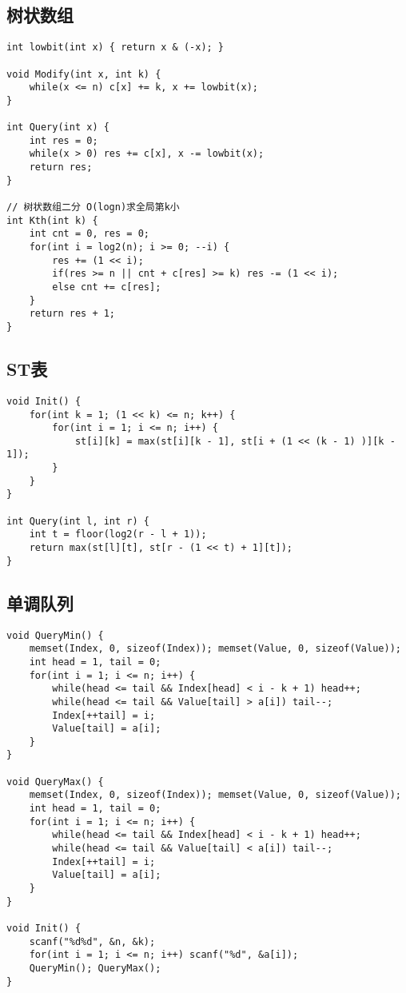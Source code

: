 \subsection{树状数组}
\begin{lstlisting}
int lowbit(int x) { return x & (-x); }

void Modify(int x, int k) {
	while(x <= n) c[x] += k, x += lowbit(x);
} 

int Query(int x) {
	int res = 0;
	while(x > 0) res += c[x], x -= lowbit(x);
	return res;
}

// 树状数组二分 O(logn)求全局第k小
int Kth(int k) {
	int cnt = 0, res = 0;
	for(int i = log2(n); i >= 0; --i) {
		res += (1 << i);
		if(res >= n || cnt + c[res] >= k) res -= (1 << i);
		else cnt += c[res];
	}
	return res + 1;
}
\end{lstlisting}


\subsection{ST表}
\begin{lstlisting}
void Init() {
	for(int k = 1; (1 << k) <= n; k++) {
		for(int i = 1; i <= n; i++) {
			st[i][k] = max(st[i][k - 1], st[i + (1 << (k - 1) )][k - 1]);
		}
	}
}

int Query(int l, int r) {
	int t = floor(log2(r - l + 1));
	return max(st[l][t], st[r - (1 << t) + 1][t]);
}
\end{lstlisting}

\subsection{单调队列}
\begin{lstlisting}
void QueryMin() {
	memset(Index, 0, sizeof(Index)); memset(Value, 0, sizeof(Value));
	int head = 1, tail = 0;
	for(int i = 1; i <= n; i++) {
		while(head <= tail && Index[head] < i - k + 1) head++;
		while(head <= tail && Value[tail] > a[i]) tail--; 
		Index[++tail] = i;
		Value[tail] = a[i];
	}
}

void QueryMax() {
	memset(Index, 0, sizeof(Index)); memset(Value, 0, sizeof(Value));
	int head = 1, tail = 0;
	for(int i = 1; i <= n; i++) {
		while(head <= tail && Index[head] < i - k + 1) head++;
		while(head <= tail && Value[tail] < a[i]) tail--;
		Index[++tail] = i;
		Value[tail] = a[i];
	}
}

void Init() {
	scanf("%d%d", &n, &k);
	for(int i = 1; i <= n; i++) scanf("%d", &a[i]);
	QueryMin(); QueryMax();
}
\end{lstlisting}

